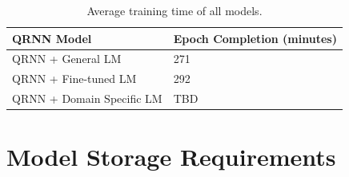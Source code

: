 \documentclass[a4paper,twoside,phd]{BYUPhys}
\begin{document}
\begin{table}[H]
	\centering
	
	\begin{tabular}{|p{4.2cm}|p{5cm}|}
		\hline
		
		\textbf{QRNN Model} & \textbf{Epoch Completion \newline (minutes)}                                                                                                                                                                                                                                                                                                                                                    \\
		\hline                                                                                                                                              
		
		QRNN + General LM  & 271  \\
		\hline
		
		QRNN + \newline Fine-tuned LM  & 292  \\
		\hline
		
		QRNN + \newline Domain Specific LM  & TBD  \\
		\hline
		
		
	\end{tabular}
	\caption{Average training time of all models.}
	\label{table:QRNNTrainingTime}
\end{table}

\section{Model Storage Requirements}
\label{sec:StorageRequirements}
\end{document}
